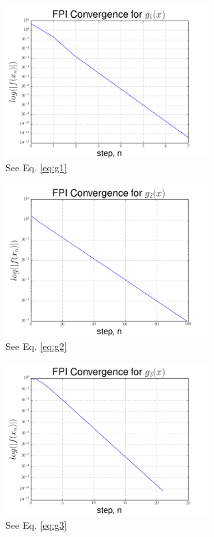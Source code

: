 \documentclass[12pt]{article}
\begin{document}
  \begin{figure}[h]
    \centering
    \includegraphics[width=0.7\textwidth]{Problem5a.png}
    \caption{See Eq. \ref{eq:g1}}
  \end{figure}
  
  \begin{figure}[h]
    \centering
    \includegraphics[width=0.7\textwidth]{Problem5b.png}
    \caption{See Eq. \ref{eq:g2}}
  \end{figure}

  \begin{figure}[h]
    \centering
    \includegraphics[width=0.7\textwidth]{Problem5c.png}
    \caption{See Eq. \ref{eq:g3}}
  \end{figure}
\end{document}
